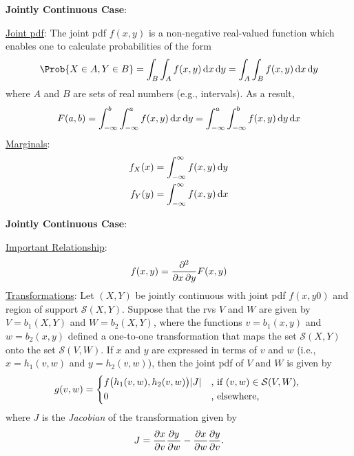 \begin{Regular}
    \textbf{Jointly Continuous Case}:

    \underline{Joint pdf}: The joint pdf $ f(x,y) $ is a non-negative real-valued function which enables one to calculate probabilities of the form
    \[ \Prob{X\in A,Y\in B}=\int_{B}\int_{A}f(x,y)\odif{x,y}=\int_A\int_B f(x,y)\odif{x,y}  \]
    where $ A $ and $ B $ are sets of real numbers (e.g., intervals). As a result,
    \[ F(a,b)=\int_{-\infty}^{b}\int_{-\infty}^{a}f(x,y)\odif{x,y}=\int_{-\infty}^{a}\int_{-\infty}^{b}f(x,y)\odif{y,x}   \]
    \underline{Marginals}:
    \begin{align*}
        f_X(x) & =\int_{-\infty}^{\infty}f(x,y)\odif{y} \\
        f_Y(y) & =\int_{-\infty}^{\infty}f(x,y)\odif{x}
    \end{align*}
\end{Regular}
\begin{Regular}
    \textbf{Jointly Continuous Case}:

    \underline{Important Relationship}:
    \[ f(x,y)=\pdv*{F(x,y)}{x,y} \]
    \underline{Transformations}: Let $ (X,Y) $ be jointly continuous with joint pdf $ f(x,y0) $ and region
    of support $ \mathcal{S}(X,Y) $. Suppose that the rvs $ V $ and $ W $ are given by $ V=b_1(X,Y) $ and $ W=b_2(X,Y) $,
    where the functions $ v=b_1(x,y) $ and $ w=b_2(x,y) $ defined a one-to-one transformation that maps the set $ \mathcal{S}(X,Y) $
    onto the set $ \mathcal{S}(V,W) $. If $ x $ and $ y $ are expressed in terms of $ v $ and $  w $ (i.e., $ x=h_1(v,w) $ and $ y=h_2(v,w) $),
    then the joint pdf of $ V $ and $ W $ is given by
    \[ g(v,w)=\begin{cases*}
            f\bigl(h_1(v,w),h_2(v,w)\bigr)\abs{J} & , if $ (v,w)\in\mathcal{S}(V,W) $, \\
            0                                     & , elsewhere,
        \end{cases*} \]
    where $ J $ is the \emph{Jacobian} of the transformation given by
    \[ J=\pdv{x}{v}\pdv{y}{w}-\pdv{x}{w}\pdv{y}{v}. \]
\end{Regular}
